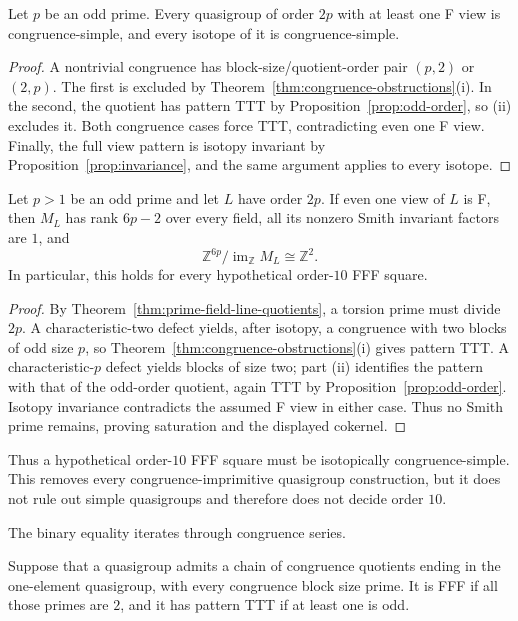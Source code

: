 \begin{corollary}\label{cor:2p-simple}
Let $p$ be an odd prime.  Every quasigroup of order $2p$ with at least one
F view is congruence-simple, and every isotope of it is congruence-simple.
\end{corollary}

\begin{proof}
A nontrivial congruence has block-size/quotient-order pair $(p,2)$ or
$(2,p)$.  The first is excluded by
Theorem~\ref{thm:congruence-obstructions}(i).  In the second, the quotient
has pattern TTT by Proposition~\ref{prop:odd-order}, so (ii) excludes it.
Both congruence cases force TTT, contradicting even one F view.
Finally, the full view pattern is isotopy invariant by
Proposition~\ref{prop:invariance}, and the same argument applies to every isotope.
\end{proof}

\begin{corollary}
\label{cor:2p-line-saturation}
Let $p>1$ be an odd prime and let $L$ have order $2p$.  If even one view of
$L$ is F, then $M_L$ has rank $6p-2$ over every field, all its nonzero Smith
invariant factors are $1$, and
\[
 \mathbb Z^{6p}/\operatorname{im}_{\mathbb Z}M_L\cong\mathbb Z^2.
\]
In particular, this holds for every hypothetical order-$10$ FFF square.
\end{corollary}

\begin{proof}
By Theorem~\ref{thm:prime-field-line-quotients}, a torsion prime must divide
$2p$.  A characteristic-two defect yields, after isotopy, a congruence with
two blocks of odd size $p$, so
Theorem~\ref{thm:congruence-obstructions}(i) gives pattern TTT.  A
characteristic-$p$ defect yields blocks of size two; part (ii) identifies the
pattern with that of the odd-order quotient, again TTT by
Proposition~\ref{prop:odd-order}.  Isotopy invariance contradicts the assumed
F view in either case.  Thus no Smith prime remains, proving saturation and
the displayed cokernel.
\end{proof}

Thus a hypothetical order-$10$ FFF square must be isotopically
congruence-simple.  This removes every congruence-imprimitive quasigroup
construction, but it does not rule out simple quasigroups and therefore does
not decide order $10$.

The binary equality iterates through congruence series.

\begin{corollary}
\label{cor:prime-congruence-series}
Suppose that a quasigroup admits a chain of congruence quotients ending in the
one-element quasigroup, with every congruence block size prime.  It is FFF if
all those primes are $2$, and it has pattern TTT if at least one is odd.
\end{corollary}

